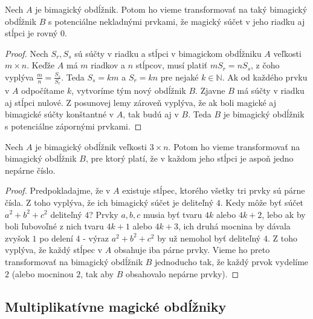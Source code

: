 \begin{subtheorem} 
\label{rectangle0}
Nech $A$ je bimagický obdĺžnik. Potom ho vieme transformovať na taký bimagický obdĺžnik $B$ s potenciálne nekladnými prvkami, že magický súčet v jeho riadku aj stĺpci je rovný $0$.
\end{subtheorem}

\begin{proof} Nech $S_r, S_s$ sú súčty v riadku a stĺpci v bimagickom obdĺžniku $A$ veľkosti $m \times n$. Keďže $A$ má $m$ riadkov a $n$ stĺpcov, musí platiť $m S_r = n S_s$, z čoho vyplýva $\frac{m}{n} = \frac{S_s}{S_r}$. Teda $S_s = km$ a $S_r = kn$ pre nejaké $k \in \mathbb{N}$. Ak od každého prvku v $A$ odpočítame $k$, vytvoríme tým nový obdĺžnik $B$. Zjavne $B$ má súčty v riadku aj stĺpci nulové. Z posunovej lemy zároveň vyplýva, že ak boli magické aj bimagické súčty konštantné v $A$, tak budú aj v $B$. Teda $B$ je bimagický obdĺžnik s potenciálne zápornými prvkami.
\end{proof}

\begin{subtheorem}
\label{rectangleodd}
Nech $A$ je bimagický obdĺžnik veľkosti $3 \times n$. Potom ho vieme transformovať na bimagický obdĺžnik $B$, pre ktorý platí, že v každom jeho stĺpci je aspoň jedno nepárne číslo.
\end{subtheorem}

\begin{proof} Predpokladajme, že v $A$ existuje stĺpec, ktorého všetky tri prvky sú párne čísla. Z toho vyplýva, že ich bimagický súčet je deliteľný $4$. Kedy môže byť súčet $a^2 + b^2 + c^2$ deliteľný $4$? Prvky $a,b,c$ musia byť tvaru $4k$ alebo $4k+2$, lebo ak by boli ľubovoľné z nich tvaru $4k+1$ alebo $4k+3$, ich druhá mocnina by dávala zvyšok $1$ po delení $4$ - výraz $a^2 + b^2 + c^2$ by už nemohol byť deliteľný $4$. Z toho vyplýva, že každý stĺpec v $A$ obsahuje iba párne prvky. Vieme ho preto transformovať na bimagický obdĺžnik $B$ jednoducho tak, že každý prvok vydelíme $2$ (alebo mocninou $2$, tak aby $B$ obsahovalo nepárne prvky).
\end{proof}



\subsection{Multiplikatívne magické obdĺžniky}

